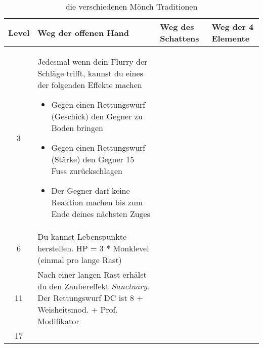 \begin{table}
	\centering
	\begin{tabular}{cp{6cm}p{6cm}p{6cm}}
	\textbf{Level} & \textbf{Weg der offenen Hand} & \textbf{Weg des Schattens} &\textbf{Weg der 4 Elemente}\\ \hline
	3 &
	Jedesmal wenn dein Flurry der Schläge trifft, kannst du eines der folgenden Effekte machen
	\begin{itemize}
		\item Gegen einen Rettungswurf (Geschick) den Gegner zu Boden bringen
		\item Gegen einen Rettungswurf (Stärke) den Gegner 15 Fuss zurückschlagen
		\item Der Gegner darf keine Reaktion machen bis zum Ende deines nächsten Zuges
	\end{itemize} &
	&
	\\ \hline
	
	6 &
	Du kannst Lebenspunkte herstellen. HP = 3 * Monklevel (einmal pro lange Rast) &
	&
	\\ \hline
	
	11 &
	Nach einer langen Rast erhälst du den Zaubereffekt \textit{Sanctuary}. Der Rettungswurf DC ist 8 + Weisheitsmod. + Prof. Modifikator &
	&
	\\ \hline
	
	17 &
	&
	&
	\\ \hline
	
	\end{tabular}
	\caption{die verschiedenen Mönch Traditionen}
\end{table}
